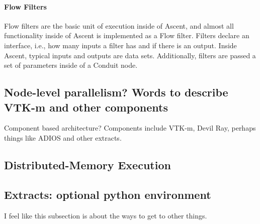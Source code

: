 \paragraph{Flow Filters}
Flow filters are the basic unit of execution inside of Ascent, and
almost all functionality inside of Ascent is implemented as a Flow filter.
%
Filters declare an interface, i.e., how many inputs a filter has and
if there is an output.
%
Inside Ascent, typical inputs and outputs are data sets.
%
Additionally, filters are passed a set of parameters inside of a Conduit
node.
%

\subsection{Node-level parallelism? Words to describe VTK-m and other components}

Component based architecture? Components include VTK-m, Devil Ray, perhaps things like ADIOS and other extracts.

\subsection{Distributed-Memory Execution}

\subsection{Extracts: optional python environment}
I feel like this subsection is about the ways to get to other things.

